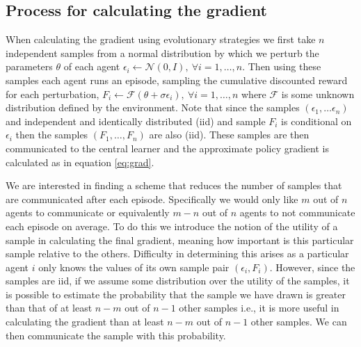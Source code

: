 \subsection{Process for calculating the gradient}
When calculating the gradient using evolutionary strategies we first take $n$ independent samples from a normal distribution by which we perturb the parameters $\theta$ of each agent $\epsilon_i \leftarrow \mathcal{N}(0,I), \ \forall i=1,\dots,n$. Then using these samples each agent runs an episode, sampling the cumulative discounted reward for each perturbation, $F_i \leftarrow \mathcal{F}(\theta+\sigma \epsilon_i), \ \forall i=1,\dots,n$ where $\mathcal{F}$ is some unknown distribution defined by the environment. Note that since the samples $(\epsilon_1,\dots\epsilon_n)$ and independent and identically distributed (iid) and sample $F_i$ is conditional on $\epsilon_i$ then the samples $(F_1,\dots,F_n)$ are also (iid). These samples are then communicated to the central learner and the approximate policy gradient is calculated as in equation \ref{eq:grad}.

We are interested in finding a scheme that reduces the number of samples that are communicated after each episode. Specifically we would only like $m$ out of $n$ agents to communicate or equivalently $m-n$ out of $n$ agents to not communicate each episode on average. To do this we introduce the notion of the utility of a sample in calculating the final gradient, meaning how important is this particular sample relative to the others. Difficulty in determining this arises as a particular agent $i$ only knows the values of its own sample pair $(\epsilon_i, F_i)$. However, since the samples are iid, if we assume some distribution over the utility of the samples, it is possible to estimate the probability that the sample we have drawn is greater than that of at least $n-m$ out of $n-1$ other samples i.e., it is more useful in calculating the gradient than at least $n-m$ out of $n-1$ other samples. We can then communicate the sample with this probability.

